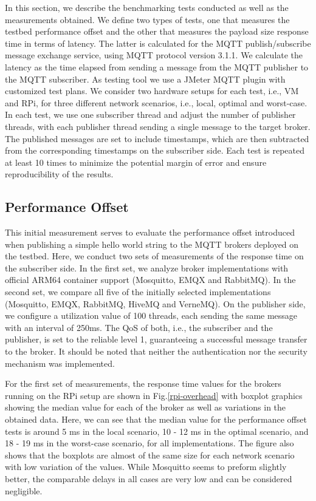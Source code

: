 \documentclass[conference]{IEEEtran}
\begin{document}
In this section, we describe the benchmarking tests conducted as well as the measurements obtained.
We define two types of tests, one that measures the testbed performance offset and the other that
measures the payload size response time in terms of latency. The latter is calculated for the MQTT
publish/subscribe message exchange service, using MQTT protocol version 3.1.1. We calculate the
latency as the time elapsed from sending a message from the MQTT publisher to the MQTT subscriber.
As testing tool we use a JMeter MQTT plugin with customized test plans. We consider two hardware
setups for each test, i.e., VM and RPi, for three different network scenarios, i.e., local, optimal
and worst-case. In each test, we use one subscriber thread and adjust the number of publisher
threads, with each publisher thread sending a single message to the target broker. The published
messages are set to include timestamps, which are then subtracted from the corresponding timestamps
on the subscriber side. Each test is repeated at least 10 times to minimize the potential margin of
error and ensure reproducibility of the results. 

\subsection{Performance Offset}

This initial measurement serves to evaluate the performance
offset introduced when publishing a simple hello world string
to the MQTT brokers deployed on the testbed. Here, we
conduct two sets of measurements of the response time on
the subscriber side. In the first set, we analyze  broker implementations with official ARM64 container support (Mosquitto, EMQX and RabbitMQ). In the second set, we compare all five
of the initially selected implementations (Mosquitto, EMQX, RabbitMQ, HiveMQ
and VerneMQ). On the publisher side,
we configure a utilization value of 100 threads, each sending the
same message with an interval of 250ms. The QoS of both,  i.e.,
the subscriber and the publisher, is set to the reliable level
1, guaranteeing a successful message transfer to the broker.
It should be noted that neither the authentication nor the security mechanism was implemented. 


For the first set of measurements, the response time values for the brokers running on the RPi setup
are shown in Fig.\ref{rpi-overhead} with boxplot graphics showing the median value for each of the
broker as well as variations in the obtained data. Here, we can see that the median value for the
performance offset tests is around 5 ms in the local scenario, 10 - 12 ms in the optimal scenario,
and 18 - 19 ms in the worst-case scenario, for all implementations. The figure also shows that the
boxplots are almost of the same size for each network scenario with low variation of the values.
While Mosquitto seems to preform slightly better, the comparable delays in all cases are very low
and can be considered negligible.
\end{document}

